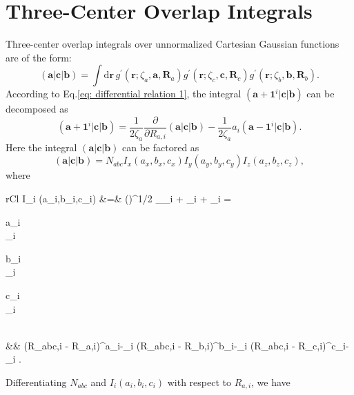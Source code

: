\documentclass[11pt,a4paper]{article}
\begin{document}
	\section{Three-Center Overlap Integrals}
	Three-center overlap integrals over unnormalized Cartesian Gaussian functions are of the form:
	\begin{equation}
		(\mathbf{a}|\mathbf{c}|\mathbf{b}) = \int \mathrm{d} \mathbf{r}\, g^{\prime}(\mathbf{r}; \zeta_a, \mathbf{a}, \mathbf{R}_a) g^{\prime}(\mathbf{r}; \zeta_c, \mathbf{c}, \mathbf{R}_c) g^{\prime}(\mathbf{r}; \zeta_b, \mathbf{b}, \mathbf{R}_b).
	\end{equation}
	According to Eq.\eqref{eq: differential relation 1}, the integral $(\mathbf{a} + \mathbf{1}^i|\mathbf{c}|\mathbf{b})$ can be decomposed as
	\begin{equation}
		(\mathbf{a} + \mathbf{1}^i|\mathbf{c}|\mathbf{b}) = \frac{1}{2 \zeta_a} \frac{\partial}{\partial R_{a,i}} (\mathbf{a}|\mathbf{c}|\mathbf{b}) - \frac{1}{2 \zeta_a} a_i (\mathbf{a} - \mathbf{1}^i|\mathbf{c}|\mathbf{b}).
		\label{eq: iterative 1}
	\end{equation}
	Here the integral $(\mathbf{a}|\mathbf{c}|\mathbf{b})$ can be factored as
	\begin{equation}
		(\mathbf{a}|\mathbf{c}|\mathbf{b}) = N_{abc} I_x (a_x,b_x,c_x) I_y (a_y,b_y,c_y) I_z (a_z,b_z,c_z),
	\end{equation}
	where
	\begin{IEEEeqnarray}{rCl}
		I_i (a_i,b_i,c_i) &=& \left(\right)^{1/2}  _{\alpha_i + \beta_i + \gamma_i = }
		\begin{pmatrix} a_i \\ \alpha_i \end{pmatrix}
		\begin{pmatrix} b_i \\ \beta_i \end{pmatrix}
		\begin{pmatrix} c_i \\ \gamma_i \end{pmatrix} \nonumber \\
		&& \times (R_{abc,i} - R_{a,i})^{a_i-\alpha_i} (R_{abc,i} - R_{b,i})^{b_i-\beta_i} (R_{abc,i} - R_{c,i})^{c_i-\gamma_i} .
	\end{IEEEeqnarray}
	Differentiating $N_{abc}$ and $I_i (a_i,b_i,c_i)$ with respect to $R_{a,i}$, we have
\end{document}
